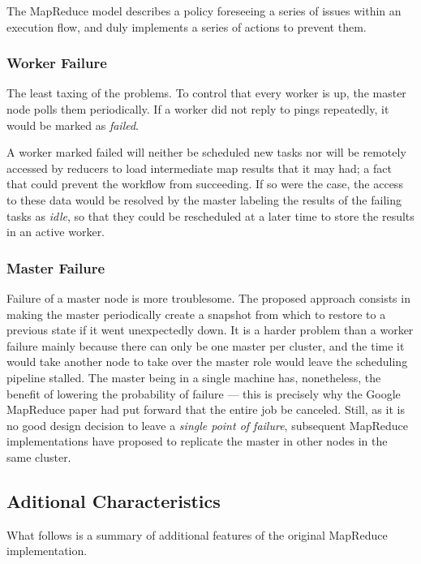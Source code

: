 The MapReduce model describes a policy foreseeing a series of issues within an execution flow, and duly implements a series of actions to prevent them.

\subsubsection{Worker Failure}\label{subsubsec:fallotrabajador}
\noindent The least taxing of the problems. To control that every worker is up, the master node polls them periodically. If a worker did not reply to pings repeatedly, it would be marked as \emph{failed}.

A worker marked failed will neither be scheduled new tasks nor will be remotely accessed by reducers to load intermediate map results that it may had; a fact that could prevent the workflow from succeeding. If so were the case, the access to these data would be resolved by the master labeling the results of the failing tasks as \emph{idle}, so that they could be rescheduled at a later time to store the results in an active worker.

\subsubsection{Master Failure}\label{subsubsec:fallomaestro}
Failure of a master node is more troublesome. The proposed approach consists in making the master periodically create a snapshot from which to restore to a previous state if it went unexpectedly down. It is a harder problem than a worker failure mainly because there can only be one master per cluster, and the time it would take another node to take over the master role would leave the scheduling pipeline stalled. The master being in a single machine has, nonetheless, the benefit of lowering the probability of failure --- this is precisely why the Google MapReduce paper \cite{googlemapreduce} had put forward that the entire job be canceled. Still, as it is no good design decision to leave a \emph{single point of failure}, subsequent MapReduce implementations have proposed to replicate the master in other nodes in the same cluster.

\subsection{Aditional Characteristics}\label{subsec:caracteristicasadicionales}
\noindent What follows is a summary of additional features of the original MapReduce implementation.

